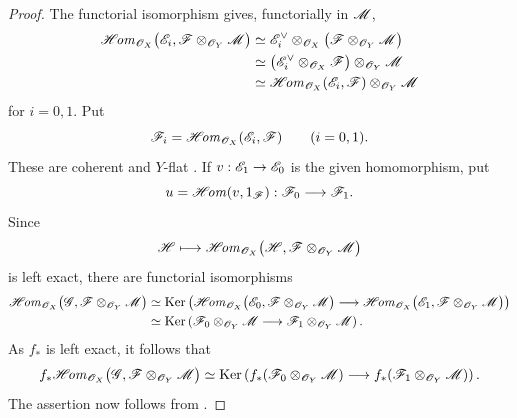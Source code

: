 \begin{proof}
The functorial isomorphism  gives,
functorially in $\mathscr{M}$,
\begin{align*}
  \mathscr{H}\!\mathit{om}_{\mathscr{O}_X}
    \bigl(\mathscr{E}_i,
      \mathscr{F}\otimes_{\mathscr{O}_Y}\mathscr{M}\bigr)
  &\simeq
  \mathscr{E}_i^\vee
    \otimes_{\mathscr{O}_X}
    \bigl(\mathscr{F}\otimes_{\mathscr{O}_Y}\mathscr{M}\bigr)\\
  &\simeq
  \bigl(
    \mathscr{E}_i^\vee\otimes_{\mathscr{O}_X}\mathscr{F}
  \bigr)
  \otimes_{\mathscr{O}_Y}\mathscr{M}\\
  &\simeq
  \mathscr{H}\!\mathit{om}_{\mathscr{O}_X}(\mathscr{E}_i,\mathscr{F})
  \otimes_{\mathscr{O}_Y}\mathscr{M}
\end{align*}
for $i=0,1$.  Put
\[
  \mathscr{F}_i
  =
  \mathscr{H}\!\mathit{om}_{\mathscr{O}_X}(\mathscr{E}_i,\mathscr{F})
  \qquad(i=0,1).
\]
These are coherent  and $Y$-flat
.  If
$v:\mathscr{E}_1\to\mathscr{E}_0$ is the given homomorphism, put
\[
  u=\mathscr{H}\!\mathit{om}(v,1_{\mathscr{F}}):\mathscr{F}_0\longrightarrow\mathscr{F}_1.
\]
Since
\[
  \mathscr{H}\longmapsto
  \mathscr{H}\!\mathit{om}_{\mathscr{O}_X}
  \bigl(\mathscr{H},
    \mathscr{F}\otimes_{\mathscr{O}_Y}\mathscr{M}\bigr)
\]
is left exact, there are functorial isomorphisms
\begin{align*}
  \mathscr{H}\!\mathit{om}_{\mathscr{O}_X}
  \bigl(\mathscr{G},
    \mathscr{F}\otimes_{\mathscr{O}_Y}\mathscr{M}\bigr)
  &\simeq
  \operatorname{Ker}\left(
    \mathscr{H}\!\mathit{om}_{\mathscr{O}_X}
      \bigl(\mathscr{E}_0,
        \mathscr{F}\otimes_{\mathscr{O}_Y}\mathscr{M}\bigr)
    \longrightarrow
    \mathscr{H}\!\mathit{om}_{\mathscr{O}_X}
      \bigl(\mathscr{E}_1,
        \mathscr{F}\otimes_{\mathscr{O}_Y}\mathscr{M}\bigr)
  \right)\\
  &\simeq
  \operatorname{Ker}\left(
    \mathscr{F}_0\otimes_{\mathscr{O}_Y}\mathscr{M}
    \longrightarrow
    \mathscr{F}_1\otimes_{\mathscr{O}_Y}\mathscr{M}
  \right).
\end{align*}
As $f_*$ is left exact, it follows that
\[
  f_*\mathscr{H}\!\mathit{om}_{\mathscr{O}_X}
  \bigl(\mathscr{G},
    \mathscr{F}\otimes_{\mathscr{O}_Y}\mathscr{M}\bigr)
  \simeq
  \operatorname{Ker}\left(
    f_*(\mathscr{F}_0\otimes_{\mathscr{O}_Y}\mathscr{M})
    \longrightarrow
    f_*(\mathscr{F}_1\otimes_{\mathscr{O}_Y}\mathscr{M})
  \right).
\]
The assertion now follows from .
\end{proof}

